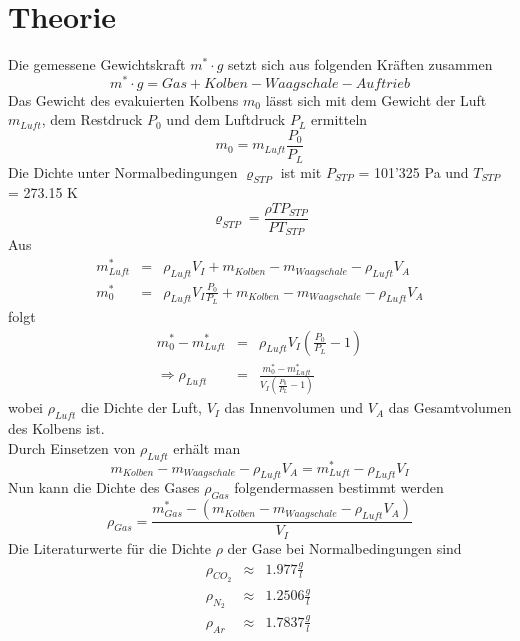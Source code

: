 \documentclass[12pt,a4paper]{article}
\begin{document}
\section*{Theorie}
Die gemessene Gewichtskraft $m^* \cdot g$ setzt sich aus folgenden Kr\"aften zusammen 
\begin{equation}
m^* \cdot g = Gas + Kolben - Waagschale - Auftrieb
\end{equation}
Das Gewicht des evakuierten Kolbens $m_0$ l\"asst sich mit dem Gewicht der Luft $m_{Luft}$, dem Restdruck $P_0$ und dem Luftdruck $P_L$ ermitteln
\begin{equation}
m_0 = m_{Luft} \frac{P_0}{P_L}
\end{equation}
Die Dichte unter Normalbedingungen $\varrho_{STP}$ ist mit $P_{STP}$ = 101'325 Pa und $T_{STP}$ = 273.15 K
\begin{equation}\label{eq:stp}
\varrho_{STP} = \frac{\rho T P_{STP}}{P T_{STP}}
\end{equation}
Aus
\begin{eqnarray}
m^*_{Luft} & = & \rho _{Luft} V_I + m_{Kolben} - m_{Waagschale} - \rho_{Luft} V_A \\
m^*_0 & = & \rho_{Luft} V_I \frac{P_0}{P_L} + m_{Kolben} - m_{Waagschale} - \rho_{Luft} V_A 
\end{eqnarray}
folgt
\begin{eqnarray}
m^*_0 - m^*_{Luft} & = & \rho_{Luft}V_I \left( \frac{P_0}{P_L}-1\right) \\
\Rightarrow \rho_{Luft} & = & \frac{m^*_0 - m^*_{Luft}}{V_I \left( \frac{P_0}{P_L}-1\right)}  \label{eq:rl}
\end{eqnarray}
wobei $\rho_{Luft}$ die Dichte der Luft, $V_I$ das Innenvolumen und $V_A$ das Gesamtvolumen des Kolbens ist. \\
Durch Einsetzen von $\rho_{Luft}$ erh\"alt man
\begin{equation}\label{eq:const}
m_{Kolben} - m_{Waagschale} - \rho_{Luft} V_A = m^*_{Luft} - \rho _{Luft} V_I
\end{equation}
Nun kann die Dichte des Gases $\rho_{Gas}$ folgendermassen bestimmt werden
\begin{equation}\label{eq:rg}
\rho _{Gas} = \frac{m^*_{Gas} - (m_{Kolben} - m_{Waagschale} - \rho_{Luft} V_A)}{V_I}
\end{equation}
Die Literaturwerte f\"ur die Dichte $\rho$ der Gase bei Normalbedingungen sind
\begin{eqnarray}
\rho_{CO_2} & \approx & 1.977 \frac{g}{l}\\
\rho_{N_2} & \approx & 1.2506  \frac{g}{l}\\
\rho_{Ar} & \approx & 1.7837  \frac{g}{l}\
\end{eqnarray}
\end{document}
